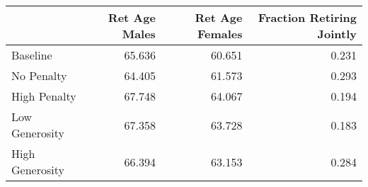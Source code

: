 \begin{tabular}{lrrr}
\toprule
{} & Ret Age Males & Ret Age Females & Fraction Retiring Jointly \\
\midrule
Baseline        &        65.636 &          60.651 &                     0.231 \\
No Penalty      &        64.405 &          61.573 &                     0.293 \\
High Penalty    &        67.748 &          64.067 &                     0.194 \\
Low Generosity  &        67.358 &          63.728 &                     0.183 \\
High Generosity &        66.394 &          63.153 &                     0.284 \\
\bottomrule
\end{tabular}
